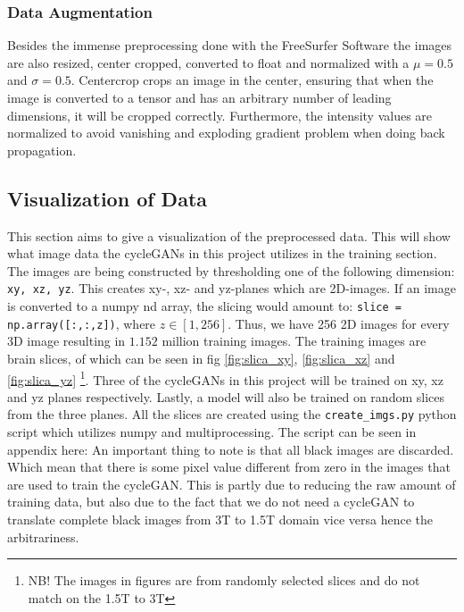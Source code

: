 \documentclass[12pt, fleqn, titlepage]{article}
\begin{document}


\subsubsection{Data Augmentation}

Besides the immense preprocessing done with the FreeSurfer Software the images are also resized, center cropped, converted to float and normalized with a $ \mu = 0.5 $ and $ \sigma = 0.5$. Centercrop crops an image in the center, ensuring that when the image is converted to a tensor and has an arbitrary number of leading dimensions, it will be cropped correctly. Furthermore, the intensity values are normalized to avoid vanishing and exploding gradient problem when doing back propagation. 


\subsection{Visualization of Data}
This section aims to give a visualization of the preprocessed data. This will show what image data the cycleGANs in this project utilizes in the training section. The images are being constructed by thresholding one of the following dimension: \texttt{xy, xz, yz}. This creates xy-, xz- and yz-planes which are 2D-images. If an image is converted to a numpy nd array, the slicing would amount to: \texttt{slice = np.array([:,:,z])}, where $ z \in [1,256] $. Thus, we have 256 2D images for every 3D image resulting in $ 1.152 $ million training images. The training images are brain slices, of which can be seen in fig \ref{fig:slica_xy}, \ref{fig:slica_xz} and \ref{fig:slica_yz} \footnote{NB! The images in figures are from randomly selected slices and do not match on the 1.5T to 3T}. Three of the cycleGANs in this project will be trained on xy, xz and yz planes respectively. Lastly, a model will also be trained on random slices from the three planes. All the slices are created using the \texttt{create\_imgs.py} python script which utilizes numpy and multiprocessing. The script can be seen in appendix here: %
An important thing to note is that all black images are discarded. Which mean that there is some pixel value different from zero in the images that are used to train the cycleGAN. This is partly due to reducing the raw amount of training data, but also due to the fact that we do not need a cycleGAN to translate complete black images from 3T to 1.5T domain vice versa hence the arbitrariness. 
\end{document}
